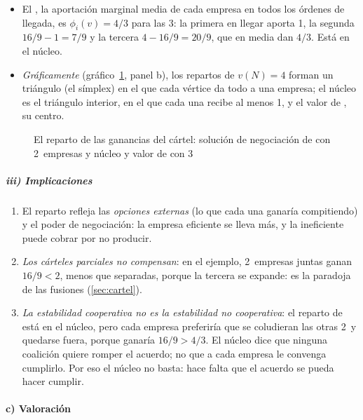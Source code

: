 \documentclass[11pt]{article}
\begin{document}
\begin{itemize}
\begin{itemize}
  \item El , la aportación marginal media de cada empresa en todos los órdenes de llegada\nocite{Shapley1953Value}, es $\phi_i(v)=4/3$ para las 3: la primera en llegar aporta 1, la segunda $16/9-1=7/9$ y la tercera $4-16/9=20/9$, que en media dan $4/3$. Está en el núcleo.
  \item \emph{Gráficamente} (gráfico~\ref{fig:reparto-cartel}, panel b), los repartos de $v(N)=4$ forman un triángulo (el símplex) en el que cada vértice da todo a una empresa; el núcleo es el triángulo interior, en el que cada una recibe al menos 1, y el valor de , su centro.
  \end{itemize}
\end{itemize}

\begin{figure}[H]
\centering
\caption{El reparto de las ganancias del cártel: solución de negociación de  con 2~empresas y núcleo y valor de  con 3}\label{fig:reparto-cartel}
\end{figure}

\subparagraph{iii) Implicaciones}

\begin{enumerate}
\item El reparto refleja las \emph{opciones externas} (lo que cada una ganaría compitiendo) y el poder de negociación: la empresa eficiente se lleva más, y la ineficiente puede cobrar por no producir.
\item \emph{Los cárteles parciales no compensan}: en el ejemplo, 2~empresas juntas ganan $16/9<2$, menos que separadas, porque la tercera se expande: es la paradoja de las fusiones (\ref{sec:cartel}).
\item \emph{La estabilidad cooperativa no es la estabilidad no cooperativa}: el reparto de  está en el núcleo, pero cada empresa preferiría que se coludieran las otras 2~y quedarse fuera, porque ganaría $16/9>4/3$. El núcleo dice que ninguna coalición quiere romper el acuerdo; no que a cada empresa le convenga cumplirlo. Por eso el núcleo no basta: hace falta que el acuerdo se pueda hacer cumplir.
\end{enumerate}

\paragraph{c) Valoración}
\end{document}
